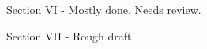 \documentclass[aps,pra,10pt,twocolumn,floatfix,nofootinbib]{revtex4-1}
\numberwithin{equation}{section}
\theoremstyle{definition}
\begin{document}
Section VI - Mostly done. Needs review.

Section VII - Rough draft





\end{document}
